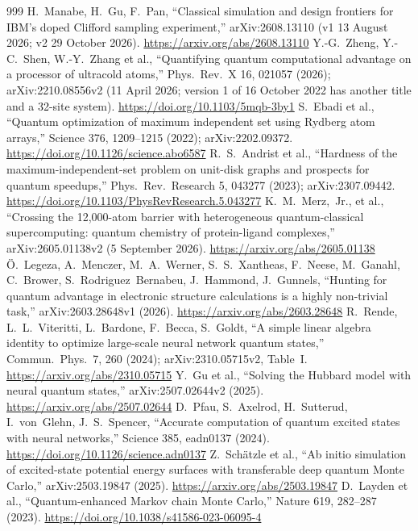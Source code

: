 \begin{thebibliography}{999}
 H.~Manabe, H.~Gu, F.~Pan, ``Classical simulation and design frontiers for IBM's doped Clifford sampling experiment,'' arXiv:2608.13110 (v1 13 August 2026; v2 29 October 2026). \url{https://arxiv.org/abs/2608.13110}
 Y.-G.~Zheng, Y.-C.~Shen, W.-Y.~Zhang et al., ``Quantifying quantum computational advantage on a processor of ultracold atoms,'' Phys.\ Rev.\ X 16, 021057 (2026); arXiv:2210.08556v2 (11 April 2026; version 1 of 16 October 2022 has another title and a 32-site system). \url{https://doi.org/10.1103/5mqb-3by1}
 S.~Ebadi et al., ``Quantum optimization of maximum independent set using Rydberg atom arrays,'' Science 376, 1209--1215 (2022); arXiv:2202.09372. \url{https://doi.org/10.1126/science.abo6587}
 R.~S.~Andrist et al., ``Hardness of the maximum-independent-set problem on unit-disk graphs and prospects for quantum speedups,'' Phys.\ Rev.\ Research 5, 043277 (2023); arXiv:2307.09442. \url{https://doi.org/10.1103/PhysRevResearch.5.043277}
 K.~M.~Merz,~Jr., et al., ``Crossing the 12,000-atom barrier with heterogeneous quantum-classical supercomputing: quantum chemistry of protein-ligand complexes,'' arXiv:2605.01138v2 (5 September 2026). \url{https://arxiv.org/abs/2605.01138}
 \"O.~Legeza, A.~Menczer, M.~A.~Werner, S.~S.~Xantheas, F.~Neese, M.~Ganahl, C.~Brower, S.~Rodriguez~Bernabeu, J.~Hammond, J.~Gunnels, ``Hunting for quantum advantage in electronic structure calculations is a highly non-trivial task,'' arXiv:2603.28648v1 (2026). \url{https://arxiv.org/abs/2603.28648}
 R.~Rende, L.~L.~Viteritti, L.~Bardone, F.~Becca, S.~Goldt, ``A simple linear algebra identity to optimize large-scale neural network quantum states,'' Commun.\ Phys.\ 7, 260 (2024); arXiv:2310.05715v2, Table~I. \url{https://arxiv.org/abs/2310.05715}
 Y.~Gu et al., ``Solving the Hubbard model with neural quantum states,'' arXiv:2507.02644v2 (2025). \url{https://arxiv.org/abs/2507.02644}
 D.~Pfau, S.~Axelrod, H.~Sutterud, I.~von~Glehn, J.~S.~Spencer, ``Accurate computation of quantum excited states with neural networks,'' Science 385, eadn0137 (2024). \url{https://doi.org/10.1126/science.adn0137}
 Z.~Sch\"atzle et al., ``Ab initio simulation of excited-state potential energy surfaces with transferable deep quantum Monte Carlo,'' arXiv:2503.19847 (2025). \url{https://arxiv.org/abs/2503.19847}
 D.~Layden et al., ``Quantum-enhanced Markov chain Monte Carlo,'' Nature 619, 282--287 (2023). \url{https://doi.org/10.1038/s41586-023-06095-4}

\end{thebibliography}
